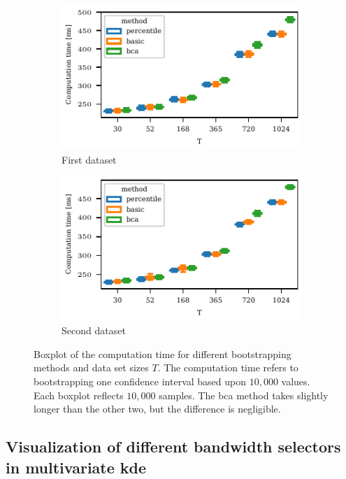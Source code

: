 \documentclass[pdflatex]{sn-jnl}
\theoremstyle{plain}%
\theoremstyle{definition}
\begin{document}
\begin{figure}
    \centering
    \begin{subfigure}{0.48\textwidth}
\includegraphics{plots/illustrative_examples/boxplot_comp_time_butterfly}
        \caption{First dataset}
    \end{subfigure}
    \begin{subfigure}{0.48\textwidth}
    \includegraphics{plots/illustrative_examples/boxplot_comp_time_normal}
        \caption{Second dataset}
    \end{subfigure}
    \caption[Boxplot of the computation time for different bootstrapping methods and data set sizes.]{Boxplot of the computation time for different bootstrapping methods and data set sizes $T$. The computation time refers to bootstrapping one confidence interval based upon $10,000$ values. Each boxplot reflects $10,000$ samples. The \ac{bca} method takes slightly longer than the other two, but the difference is negligible.}
    \label{fig:trending_bootstrap_time}
\end{figure}


\subsection{Visualization of different bandwidth selectors in multivariate \ac{kde}}\label{subsec:appendix-kde}
\end{document}
